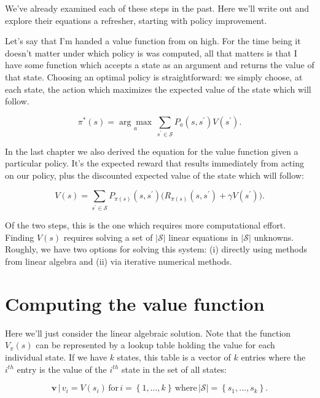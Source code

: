 \documentclass[12pt]{article}
\begin{document}
We've already examined each of these steps in the past. Here we'll write out and explore their equations a refresher, starting with policy improvement.

Let's say that I'm handed a value function from on high. For the time being it doesn't matter under which policy is was computed, all that matters is that I have some function which accepts a state as an argument and returns the value of that state. Choosing an optimal policy is straightforward: we simply choose, at each state, the action which maximizes the expected value of the state which will follow. 

\begin{equation}
\pi^*(s) = \underset{a}{\arg\max} \, \sum_{s^\prime \in \mathscr{S}} P_a(s, s^\prime) V(s^\prime).
\end{equation}

In the last chapter we also derived the equation for the value function given a particular policy. It's the expected reward that results immediately from acting on our policy, plus the discounted expected value of the state which will follow:

\begin{equation}
\label{eq:value} V(s) = \sum_{s^\prime \in \mathscr{S}} P_{\pi(s)}(s, s^\prime) \Big(R_{\pi(s)}(s, s^\prime) + \gamma V(s^\prime)\Big).
\end{equation}

Of the two steps, this is the one which requires more computational effort. Finding $V(s)$ requires solving a set of $|\mathscr{S}|$ linear equations in $|\mathscr{S}|$ unknowns. Roughly, we have two options for solving this system: (i) directly using methods from linear algebra and (ii) via iterative numerical methods.

\section{Computing the value function}

Here we'll just consider the linear algebraic solution. Note that the function $V_\pi(s)$ can be represented by a lookup table holding the value for each individual state. If we have $k$ states, this table is a vector of $k$ entries where the $i^{th}$ entry is the value of the $i^{th}$ state in the set of all states:

\begin{equation}
\mathbf{v} \, | \, v_i = V(s_i) \, \mbox{for} \, i = \left\{1, ..., k\right\} \, \mbox{where} \, |\mathscr{S}| = \left\{s_1, ..., s_k\right\}.
\end{equation}
\end{document}
